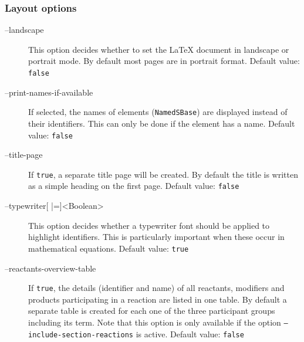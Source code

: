 \subsubsection{Layout options}
\begin{description}
\item[--landscape]
  This option decides whether to set the \LaTeX{} document in landscape
  or portrait mode. By default most pages are in portrait format.
  Default value: \texttt{false}

\item[--print-names-if-available]
  If selected, the names of \SBML elements (\texttt{NamedSBase}) are displayed
  instead of their identifiers. This can only be done if the element
  has a name.
  Default value: \texttt{false}

\item[--title-page]
  If \texttt{true}, a separate title page will be created. By default the
  title is written as a simple heading on the first page.
  Default value: \texttt{false}

\item[--typewriter{[} |={]}<Boolean>]
  This option decides whether a typewriter font should be applied
  to highlight \SBML identifiers. This is particularly important
  when these occur in mathematical equations.
  Default value: \texttt{true}

\item[--reactants-overview-table]
  If \texttt{true}, the details (identifier and name) of all reactants,
  modifiers and products participating in a reaction are listed
  in one table. By default a separate table is created for each
  one of the three participant groups including its \SBO term.
  Note that this option is only available if the option
  \texttt{--include-section-reactions} is active.
  Default value: \texttt{false}
\end{description}


